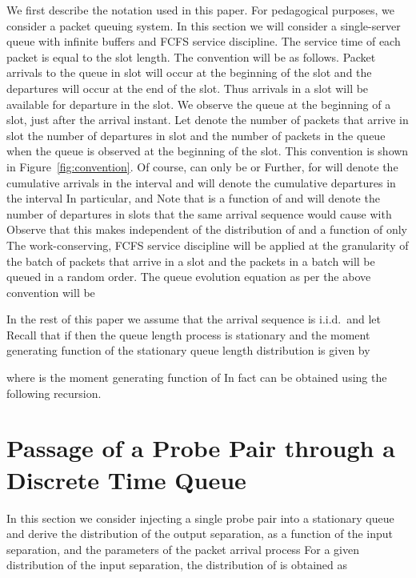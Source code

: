 \documentclass[11pt]{article}
\begin{document}
We first describe the notation used in this paper. For pedagogical
purposes, we consider a packet queuing system. In this section we will
consider a single-server queue with infinite buffers and FCFS service
discipline.  The service time of each packet is equal to the slot
length. The convention will be as follows.  Packet arrivals to the
queue in slot  will occur at the beginning of the slot and the
departures will occur at the end of the slot. Thus arrivals in a slot
will be available for departure in the slot. We observe the queue at
the beginning of a slot, just after the arrival instant. Let 
denote the number of packets that arrive in slot   the number
of departures in slot  and  the number of packets in the queue
when the queue is observed at the beginning of the slot. This
convention is shown in Figure~\ref{fig:convention}. Of course, 
can only be  or  Further, for   will denote the cumulative arrivals in the
interval  and  will
denote the cumulative departures in the interval  In
particular,  and  Note that  is a
function of  and   will denote the
number of departures in slots  that the same arrival sequence
 would cause with  Observe that this makes
 independent of the distribution of  and a function of
only  The work-conserving, FCFS service discipline
will be applied at the granularity of the batch of packets that arrive
in a slot and the packets in a batch will be queued in a random order.
The queue evolution equation as per the above convention will be


In the rest of this paper we assume that the arrival sequence  is
i.i.d.~and let  Recall that if  then the queue length process is stationary and the moment
generating function  of the stationary queue length
distribution  is given by

where  is the moment generating function of   In
fact  can be obtained using the following recursion.



\section{Passage of a Probe Pair through a Discrete Time Queue}
\label{sec:output-dispersion}
In this section we consider injecting a single probe pair into a
stationary queue and derive the distribution of the output separation,
 as a function of the input separation,  and the
parameters of the packet arrival process  For a given
distribution of the input separation, the distribution of  is
obtained as
\end{document}
